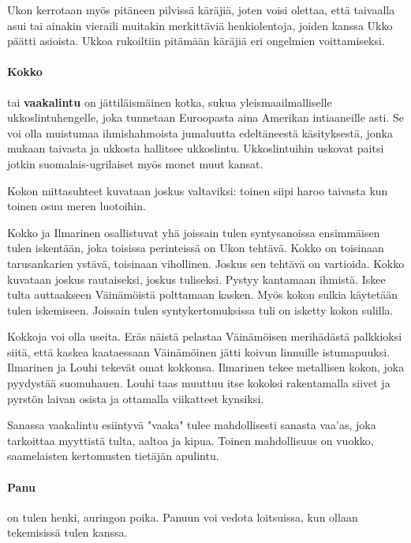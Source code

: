     Ukon kerrotaan myös pitäneen pilvissä käräjiä, joten voisi olettaa, että taivaalla asui 
    tai ainakin vieraili muitakin merkittäviä henkiolentoja, joiden kanssa Ukko päätti asioista. 
    Ukkoa rukoiltiin pitämään käräjiä eri ongelmien voittamiseksi.

  \paragraph{Kokko} tai \textbf{vaakalintu} on jättiläismäinen kotka, sukua yleismaailmalliselle 
    ukkos\-lintuhengelle, joka tunnetaan Euroopasta aina Amerikan intiaaneille asti. Se voi olla 
    muistumaa ihmishahmoista jumaluutta edeltäneestä käsityksestä, jonka mukaan taivasta ja 
    ukkosta hallitsee ukkoslintu. Ukkoslintuihin uskovat paitsi jotkin suomalais-ugrilaiset myös 
    monet muut kansat. \par Kokon mittasuhteet kuvataan joskus valtaviksi: toinen siipi haroo taivasta
    kun toinen osuu meren luotoihin. \par Kokko ja Ilmarinen osallistuvat yhä joissain tulen syntysanoissa 
    ensimmäisen tulen iskentään, joka toisissa perinteissä on Ukon tehtävä. Kokko on toisinaan 
    tarusankarien ystävä, toisinaan vihollinen. Joskus sen tehtävä on vartioida. Kokko kuvataan 
    joskus rautaiseksi, joskus tuliseksi. Pystyy kantamaan ihmistä. Iskee tulta auttaakseen 
    Väinämöistä polttamaan kasken. Myös kokon sulkia käytetään tulen iskemiseen. Joissain tulen 
    syntykertomuksissa tuli on isketty kokon sulilla. \par Kokkoja voi olla 
    useita. Eräs näistä pelastaa Väinämöisen merihädästä palkkioksi siitä, että kaskea 
    kaataessaan Väinämöinen jätti koivun linnuille istumapuuksi. Ilmarinen ja Louhi tekevät 
    omat kokkonsa. Ilmarinen tekee metallisen kokon, joka pyydystää suomuhauen. Louhi taas 
    muuttuu itse kokoksi rakentamalla siivet ja pyrstön laivan osista ja ottamalla viikatteet 
    kynsiksi. \par Sanassa vaakalintu esiintyvä "vaaka" tulee mahdollisesti sanasta vaa’as, joka 
    tarkoittaa myyttistä tulta, aaltoa ja kipua. Toinen mahdollisuus on vuokko, saamelaisten 
    kertomusten tietäjän apulintu.
  \paragraph{Panu} on tulen henki, auringon poika. Panuun voi vedota loitsuissa, kun ollaan 
    tekemisissä tulen kanssa. 

  
